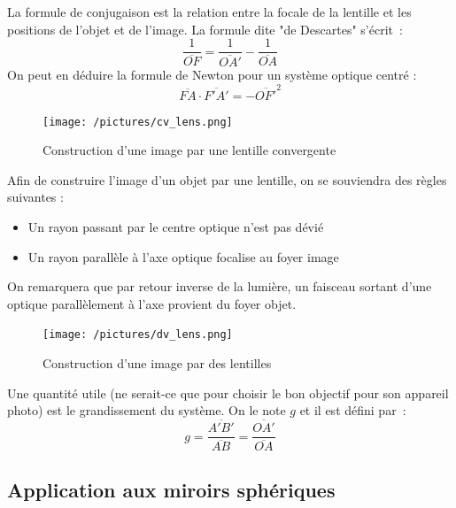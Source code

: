 \documentclass[a4paper]{book}
\begin{document}
La formule de conjugaison est la relation entre la focale de la lentille et les positions de l'objet et de l'image. La formule dite "de Descartes" s'écrit~:
\begin{equation}
\label{eq:descartes}
\frac{1}{\overline{OF}}=\frac{1}{\overline{OA'}}-\frac{1}{\overline{OA}}
\end{equation}
On peut en déduire la formule de Newton pour un système optique centré : 
\begin{equation}
\label{eq:newton}
\overline{FA}\cdot\overline{F'A'}=-\overline{OF'}^2
\end{equation}

\begin{figure}[!htbp]
\label{fig:image_lentille_convergente}
\begin{center}
\texttt{[image: /pictures/cv\_lens.png]}
\end{center}
\caption{Construction d'une image par une lentille convergente}
\end{figure}

Afin de construire l'image d'un objet par une lentille, on se souviendra des règles suivantes : 
\begin{itemize}
    \item Un rayon passant par le centre optique n'est pas dévié
    \item Un rayon parallèle à l'axe optique focalise au foyer image
\end{itemize}
On remarquera que par retour inverse de la lumière, un faisceau sortant d'une optique parallèlement à l'axe provient du foyer objet.



\begin{figure}[!htbp]
\label{fig:image_lentille_divergente}
\begin{center}
\texttt{[image: /pictures/dv\_lens.png]}
\end{center}
\caption{Construction d'une image par des lentilles}
\end{figure}

Une quantité utile (ne serait-ce que pour choisir le bon objectif pour son appareil photo) est le grandissement du système. On le note $g$ et il est défini par~:
\begin{equation}
\label{eq:grandissement}
g=\frac{\overline{A'B'}}{\overline{AB}}=\frac{\overline{OA'}}{\overline{OA}}
\end{equation}

\subsection{Application aux miroirs sphériques}
\end{document}
